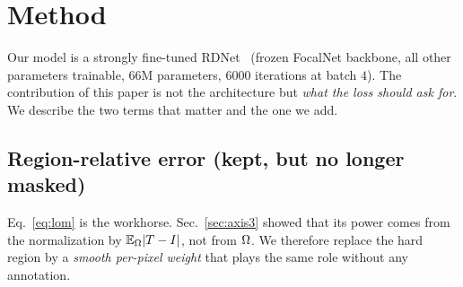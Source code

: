 \section{Method}
\label{sec:method}

Our model is a strongly fine-tuned RDNet~\cite{rdnet25} (frozen FocalNet backbone, all other
parameters trainable, $66$M parameters, $6000$ iterations at batch $4$). The contribution of this
paper is not the architecture but \emph{what the loss should ask for}. We describe the two terms
that matter and the one we add.

\subsection{Region-relative error (kept, but no longer masked)}

Eq.~\eqref{eq:lom} is the workhorse. Sec.~\ref{sec:axis3} showed that its power comes from the
normalization by $\mathbb{E}_{\Omega}|T-I|$, not from $\Omega$. We therefore replace the hard region by a
\emph{smooth per-pixel weight} that plays the same role without any annotation.

